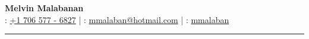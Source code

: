\documentclass[11pt, letterpaper]{article}
\begin{document}
\begin{center}
    {\Large \textbf{Melvin Malabanan}} \\ [0.5em]
    \faPhone: \href{tel:+17065776827}{+1 706 577 - 6827} \quad | \quad
    \faEnvelope: \href{mailto:mmalaban@hotmailcom}{mmalaban@hotmail.com} \quad | \quad
    \faGithub: \href{https://github.com/mmalaban}{mmalaban}
\end{center}

\vspace{0.5em}
\hrule







\end{document}
